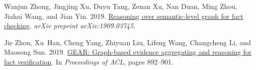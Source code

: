 \documentclass[11pt,a4paper]{article}
\begin{document}
\begin{thebibliography}{37}
Wanjun Zhong, Jingjing Xu, Duyu Tang, Zenan Xu, Nan Duan, Ming Zhou, Jiahai
  Wang, and Jian Yin. 2019.
\newblock \href {http://arxiv.org/abs/1909.03745} {Reasoning over
  semantic-level graph for fact checking}.
\newblock \emph{arXiv preprint arXiv:1909.03745}.

Jie Zhou, Xu~Han, Cheng Yang, Zhiyuan Liu, Lifeng Wang, Changcheng Li, and
  Maosong Sun. 2019.
\newblock \href {https://www.aclweb.org/anthology/P19-1085} {{GEAR}:
  Graph-based evidence aggregating and reasoning for fact verification}.
\newblock In \emph{Proceedings of ACL}, pages 892--901.

\end{thebibliography}
 
\end{document}
